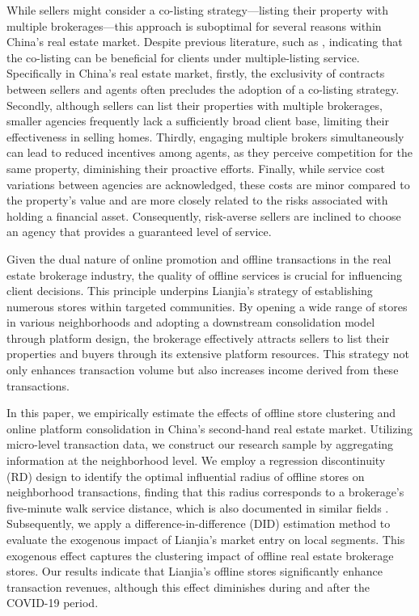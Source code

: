 \documentclass[11pt]{article}
\begin{document}
While sellers might consider a co-listing strategy—listing their property with multiple brokerages—this approach is suboptimal for several reasons within China's real estate market. Despite previous literature, such as \citep{RePEc:kap:jrefec:v:67:y:2023:i:3:d:10.1007_s11146-021-09858-w}, indicating that the co-listing can be beneficial for clients under multiple-listing service. Specifically in China's real estate market, firstly, the exclusivity of contracts between sellers and agents often precludes the adoption of a co-listing strategy. Secondly, although sellers can list their properties with multiple brokerages, smaller agencies frequently lack a sufficiently broad client base, limiting their effectiveness in selling homes. Thirdly, engaging multiple brokers simultaneously can lead to reduced incentives among agents, as they perceive competition for the same property, diminishing their proactive efforts. Finally, while service cost variations between agencies are acknowledged, these costs are minor compared to the property's value and are more closely related to the risks associated with holding a financial asset. Consequently, risk-averse sellers are inclined to choose an agency that provides a guaranteed level of service. 

Given the dual nature of online promotion and offline transactions in the real estate brokerage industry, the quality of offline services is crucial for influencing client decisions. This principle underpins Lianjia's strategy of establishing numerous stores within targeted communities. By opening a wide range of stores in various neighborhoods and adopting a downstream consolidation model through platform design, the brokerage effectively attracts sellers to list their properties and buyers through its extensive platform resources. This strategy not only enhances transaction volume but also increases income derived from these transactions.

In this paper, we empirically estimate the effects of offline store clustering and online platform consolidation in China's second-hand real estate market. Utilizing micro-level transaction data, we construct our research sample by aggregating information at the neighborhood level. We employ a regression discontinuity (RD) design to identify the optimal influential radius of offline stores on neighborhood transactions, finding that this radius corresponds to a brokerage's five-minute walk service distance, which is also documented in similar fields \citep{AZMI2012406}. Subsequently, we apply a difference-in-difference (DID) estimation method to evaluate the exogenous impact of Lianjia's market entry on local segments. This exogenous effect captures the clustering impact of offline real estate brokerage stores. Our results indicate that Lianjia's offline stores significantly enhance transaction revenues, although this effect diminishes during and after the COVID-19 period.
\end{document}
